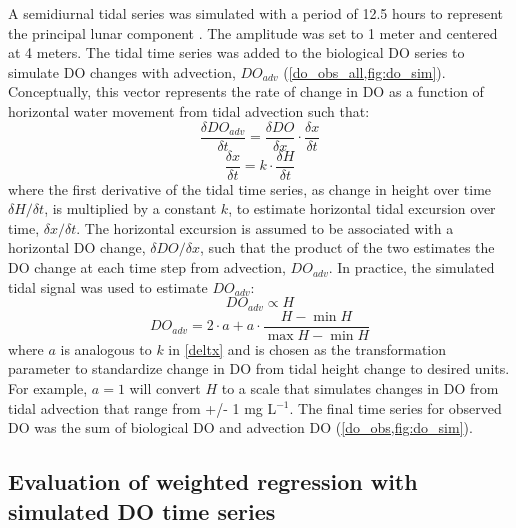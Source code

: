 \documentclass[letterpaper,12pt,oneside]{article}\usepackage[]{graphicx}\usepackage[]{color}
\begin{document}
A semidiurnal tidal series was simulated with a period of 12.5 hours to represent the principal lunar component \citep{Foreman89}.  The amplitude was set to 1 meter and centered  at 4 meters.  The tidal time series was added to the biological \ac{DO} series to simulate \ac{DO} changes with advection, $DO_{adv}$ (\cref{do_obs_all,fig:do_sim}). Conceptually, this vector represents the rate of change in \ac{DO} as a function of horizontal water movement from tidal advection such that:
\begin{equation} \label{deltdo}
\frac{\delta DO_{adv}}{\delta t} = \frac{\delta DO}{\delta x} \cdot \frac{\delta x}{\delta t}
\end{equation}
\begin{equation} \label{deltx}
\frac{\delta x}{\delta t} = k \cdot \frac{\delta H}{\delta t}
\end{equation}
where the first derivative of the tidal time series, as change in height over time $\delta H / \delta t$, is multiplied by a constant $k$, to estimate horizontal tidal excursion over time, $\delta x / \delta t$.  The horizontal excursion is assumed to be associated with a horizontal \ac{DO} change, $\delta DO / \delta x$, such that the product of the two estimates the \ac{DO} change at each time step from advection, $DO_{adv}$. In practice, the simulated tidal signal was used to estimate $DO_{adv}$:
\begin{equation} \label{do_advp}
DO_{adv} \propto H
\end{equation}
\begin{equation} \label{do_adv}
DO_{adv} = 2\cdot a + a \cdot \frac{H- \min H}{\max H - \min H}
\end{equation}
where $a$ is analogous to $k$ in \cref{deltx} and is chosen as the transformation parameter to standardize change in \ac{DO} from tidal height change to desired units.  For example, $a = 1$ will convert $H$ to a scale that simulates changes in \ac{DO} from tidal advection that range from +/- 1 mg L$^{-1}$.  The final time series for observed \ac{DO} was the sum of biological \ac{DO} and advection \ac{DO} (\cref{do_obs,fig:do_sim}).

\subsection{Evaluation of weighted regression with simulated \ac{DO} time series}
\end{document}
